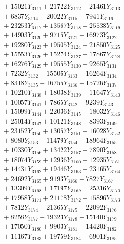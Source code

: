 \documentclass[a4paper,10pt]{article}
\begin{document}
{\begin{align}
&\;  + 15021 Y_{3111} + 21722 Y_{3112} + 21461 Y_{3113} \\[0.3ex]
&\;  + 6837 Y_{3114} + 20022 Y_{3115} + 7941 Y_{3116} \\[0.3ex]
&\;  + 23253 Y_{3117} + 13567 Y_{3118} + 25538 Y_{3119} \\[0.5ex]\allowbreak
&\;  + 14903 Y_{3120} + 9715 Y_{3121} + 16973 Y_{3122} \\[0.3ex]
&\;  + 19280 Y_{3123} + 19505 Y_{3124} + 21850 Y_{3125} \\[0.3ex]
&\;  + 15553 Y_{3126} + 15274 Y_{3127} + 17867 Y_{3128} \\[0.3ex]
&\;  + 16276 Y_{3129} + 19555 Y_{3130} + 9265 Y_{3131} \\[0.3ex]
&\;  + 7232 Y_{3132} + 15506 Y_{3133} + 16264 Y_{3134} \\[0.3ex]
&\;  + 8318 Y_{3135} + 16755 Y_{3136} + 15726 Y_{3137} \\[0.3ex]
&\;  + 10210 Y_{3138} + 18038 Y_{3139} + 11647 Y_{3140} \\[0.3ex]
&\;  + 10057 Y_{3141} + 7865 Y_{3142} + 9239 Y_{3143} \\[0.3ex]
&\;  + 15099 Y_{3144} + 22036 Y_{3145} + 18032 Y_{3146} \\[0.3ex]
&\;  + 25014 Y_{3147} + 10121 Y_{3148} + 8393 Y_{3149} \\[0.5ex]\allowbreak
&\;  + 23152 Y_{3150} + 13057 Y_{3151} + 16028 Y_{3152} \\[0.3ex]
&\;  + 8080 Y_{3153} + 11479 Y_{3154} + 18964 Y_{3155} \\[0.3ex]
&\;  + 10330 Y_{3156} + 13422 Y_{3157} + 7890 Y_{3158} \\[0.3ex]
&\;  + 18074 Y_{3159} + 12936 Y_{3160} + 12935 Y_{3161} \\[0.3ex]
&\;  + 14431 Y_{3162} + 19446 Y_{3163} + 23165 Y_{3164} \\[0.3ex]
&\;  + 24692 Y_{3165} + 9193 Y_{3166} + 7827 Y_{3167} \\[0.3ex]
&\;  + 13309 Y_{3168} + 17197 Y_{3169} + 25316 Y_{3170} \\[0.3ex]
&\;  + 17958 Y_{3171} + 21178 Y_{3172} + 15896 Y_{3173} \\[0.3ex]
&\;  + 7812 Y_{3174} + 21365 Y_{3175} + 22092 Y_{3176} \\[0.3ex]
&\;  + 8258 Y_{3177} + 19323 Y_{3178} + 15140 Y_{3179} \\[0.5ex]\allowbreak
&\;  + 17050 Y_{3180} + 9903 Y_{3181} + 14420 Y_{3182} \\[0.3ex]
&\;  + 11167 Y_{3183} + 19759 Y_{3184} + 6901 Y_{3185} \\[0.3ex]

\end{align}}
\end{document}

